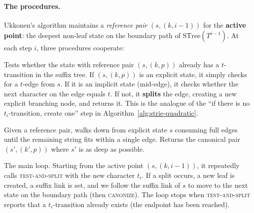 \paragraph{The procedures.}
Ukkonen's algorithm maintains a \emph{reference pair} $(s, (k, i-1))$
for the \textbf{active point}: the deepest non-leaf state on the
boundary path of $\mathrm{STree}(T^{i-1})$.
At each step $i$, three procedures cooperate:

\begin{description}[style=nextline, leftmargin=1.5cm]
  \item[\textsc{test-and-split}$(s, (k, p), t)$.]
    Tests whether the state with reference pair $(s, (k, p))$ already
    has a $t$-transition in the suffix tree.
    If $(s, (k,p))$ is an explicit state, it simply checks for a
    $t$-edge from $s$.
    If it is an implicit state (mid-edge), it checks whether the next
    character on the edge equals $t$.
    If not, it \textbf{splits} the edge, creating a new explicit
    branching node, and returns it.
    This is the analogue of the ``if there is no $t_i$-transition,
    create one'' step in Algorithm~\ref{alg:strie-quadratic}.

  \item[\textsc{canonize}$(s, (k, p))$.]
    Given a reference pair, walks down from explicit state $s$
    consuming full edges until the remaining string fits within a
    single edge.
    Returns the canonical pair $(s', (k', p))$ where $s'$ is as deep
    as possible.

  \item[\textsc{update}$(s, (k, i))$.]
    The main loop.
    Starting from the active point $(s, (k, i-1))$, it repeatedly
    calls \textsc{test-and-split} with the new character $t_i$.
    If a split occurs, a new leaf is created, a suffix link is set,
    and we follow the suffix link of $s$ to move to the next state on
    the boundary path (then \textsc{canonize}).
    The loop stops when \textsc{test-and-split} reports that a
    $t_i$-transition already exists (the endpoint has been reached).
\end{description}

\begin{algorithm}[H]
  \caption{\textsc{test-and-split}$(s, (k, p), t)$}
  \label{alg:test-and-split}
\end{algorithm}

